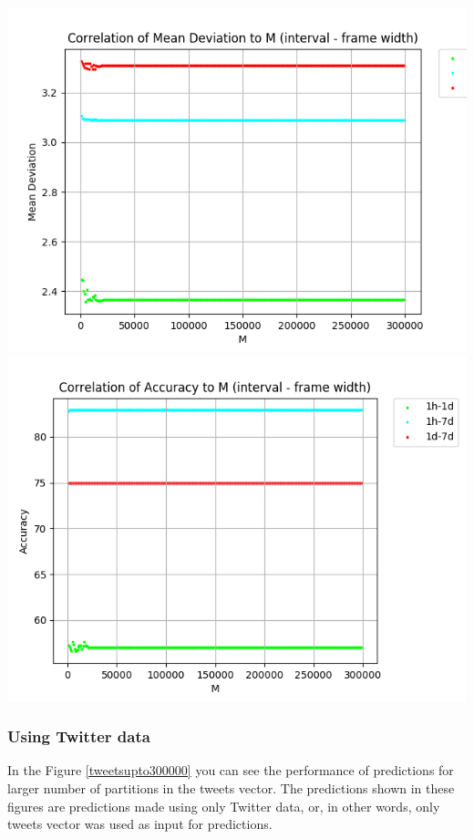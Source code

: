\documentclass[a4paper,11pt,oneside]{article}
\begin{document}
   
   
   \begin{minipage}{\linewidth}
   	\includegraphics[width=0.55\linewidth]{./data/PriceAndTweets/ErrorVsTweetsN_1000to300000.png}
   	\includegraphics[width=0.55\linewidth]{./data/PriceAndTweets/AccuracyVsTweetsN_1000to300000.png}
   	\label{pricesandtweetsupto300000}
   \end{minipage}%
   \hfill
   
   
   \subsubsection{Using Twitter data}
   In the Figure \ref{tweetsupto300000} you can see the performance of predictions for larger number of partitions in the tweets vector. The predictions shown in these figures are predictions made using only Twitter data, or, in other words, only tweets vector was used as input for predictions.
   
   
   
\end{document}
